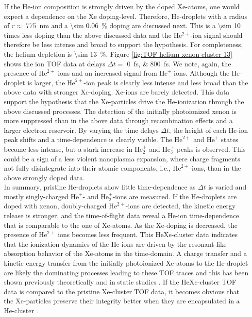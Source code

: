 If the He-ion composition is strongly driven by the doped Xe-atoms, one would expect a dependence on the Xe doping-level. Therefore, He-droplets with a radius of $r\approx$ \SI{775}{\nano\meter} and a \SI{\sim 0.06}{\percent} doping are discussed next. This is a \num{\sim 10} times less doping than the above discussed data and the He$^{2+}$-ion signal should therefore be less intense and broad to support the hypothesis. For completeness, the helium depletion is \SI{\sim 13}{\percent}. Figure \ref{fig:TOF-helium-xenon-cluster-13} shows the ion TOF data at delays $\Delta t=$ \SIlist{0;800}{\femto\second}. We note, again, the presence of $\text{He}^{2+}$ ions and an increased signal from $\text{He}^{+}$ ions. Although the He-droplet is larger, the $\text{He}^{2+}$-ion peak is clearly less intense and less broad than the above data with stronger Xe-doping. Xe-ions are barely detected. This data support the hypothesis that the Xe-particles drive the He-ionization through the above discussed processes. The detection of the initially photoionized xenon is more suppressed than in the above data through recombination effects and a larger electron reservoir. By varying the time delays $\Delta t$, the height of each He-ion peak shifts and a time-dependence is clearly visible. The $\text{He}^{2+}$ and $\text{He}^{+}$ states become less intense, but a stark increase in $\text{He}_{2}^{+}$ and $\text{He}_{3}^{+}$ peaks is observed. This could be a sign of a less violent nanoplasma expansion, where charge fragments not fully disintegrate into their atomic components, i.e., $\text{He}^{2+}$-ions, than in the above strongly doped data.\\[1\baselineskip]
%
In summary, pristine He-droplets show little time-dependence as $\Delta t$ is varied and mostly singly-charged $\text{He}^{+}$- and $\text{He}_{2}^{+}$-ions are measured. If the He-droplets are doped with xenon, doubly-charged $\text{He}^{2+}$-ions are detected, the kinetic energy release is stronger, and the time-of-flight data reveal a He-ion time-dependence that is comparable to the one of Xe-atoms. As the Xe-doping is decreased, the presence of $\text{He}^{2+}$ ions becomes less frequent. This HeXe-cluster data indicates that the ionization dynamics of the He-ions are driven by the resonant-like absorption behavior of the Xe-atoms in the time-domain. A charge transfer and a kinetic energy transfer from the initially photoionized Xe-atoms to the He-droplet are likely the dominating processes leading to these TOF traces and this has been shown previously theoretically \cite{Hau-Riege-2007-PRL} and in static studies \cite{Hoener-2008-JPB,Sugishima-2012-PRA,Muller-2015-JPhysB}. If the HeXe-cluster TOF data is compared to the pristine Xe-cluster TOF data, it becomes obvious that the Xe-particles preserve their integrity better when they are encapsulated in a He-cluster \cite{Hoener-2008-JPB,Muller-2015-JPhysB,Sugishima-2012-PRA}.
